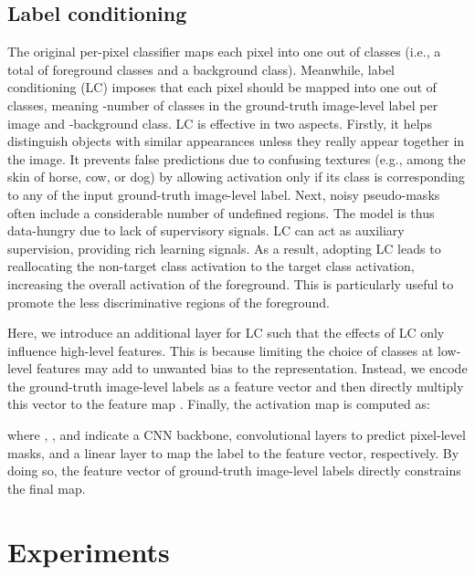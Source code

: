 \documentclass[10pt,twocolumn,letterpaper]{article}
\begin{document}
\subsection{Label conditioning}\label{subsection:4.3}

The original per-pixel classifier maps each pixel into one out of  classes (i.e., a total of  foreground classes and a background class). Meanwhile, label conditioning (LC) imposes that each pixel should be mapped into one out of  classes, meaning -number of classes in the ground-truth image-level label per image and -background class. LC is effective in two aspects. Firstly, it helps distinguish objects with similar appearances unless they really appear together in the image. It prevents false predictions due to confusing textures (e.g., among the skin of horse, cow, or dog) by allowing activation only if its class is corresponding to any of the input ground-truth image-level label. Next, noisy pseudo-masks  often include a considerable number of undefined regions. The model is thus data-hungry due to lack of supervisory signals. LC can act as auxiliary supervision, providing rich learning signals. As a result, adopting LC leads to reallocating the non-target class activation to the target class activation, increasing the overall activation of the foreground. This is particularly useful to promote the less discriminative regions of the foreground.

Here, we introduce an additional layer for LC such that the effects of LC only influence high-level features. This is because limiting the choice of classes at low-level features may add to unwanted bias to the representation. Instead, we encode the ground-truth image-level labels as a feature vector and then directly multiply this vector to the feature map . Finally, the activation map  is computed as:

\vspace{-2mm}
\vspace{-2mm}

\noindent where , , and  indicate a CNN backbone, convolutional layers to predict pixel-level masks, and a linear layer to map the label to the feature vector, respectively. By doing so, the feature vector of ground-truth image-level labels directly constrains the final map.
 \section{Experiments}
\end{document}

